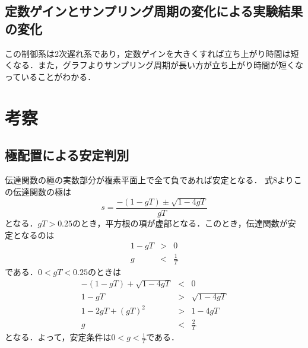 \documentclass[11pt,a4paper]{jsarticle}
\begin{document}
\subsection{定数ゲインとサンプリング周期の変化による実験結果の変化}
この制御系は2次遅れ系であり，定数ゲインを大きくすれば立ち上がり時間は短くなる．また，グラフよりサンプリング周期が長い方が立ち上がり時間が短くなっていることがわかる．


\newpage
\pagestyle{fancy}
\setcounter{page}{1}
\setcounter{section}{4}
\setcounter{figure}{0}
\renewcommand{\thepage}{$再々$\,\arabic{page}}
\renewcommand{\headrulewidth}{0.0pt}
\rhead{\thepage}
\lhead{}
\cfoot{}


\section{考察}
\subsection{極配置による安定判別}
伝達関数の極の実数部分が複素平面上で全て負であれば安定となる．
式8よりこの伝達関数の極は
\begin{equation}
 s = \frac{-(1-gT) \pm \sqrt{1-4gT}}{gT}
\end{equation}
となる．$gT > 0.25$のとき，平方根の項が虚部となる．このとき，伝達関数が安定となるのは
\begin{eqnarray*}
 1-gT & > & 0 \\
 g & < & \frac{1}{T}
\end{eqnarray*}
である．$0 < gT < 0.25$のときは
\begin{eqnarray*}
 -(1-gT)+\sqrt{1-4gT} & < & 0 \\
 1-gT & > & \sqrt{1-4gT} \\
1-2gT+(gT)^2 & > & 1-4gT \\
g & < & \frac{2}{T}
\end{eqnarray*}
となる．よって，安定条件は$0 < g < \frac{1}{T}$である．
\end{document}
